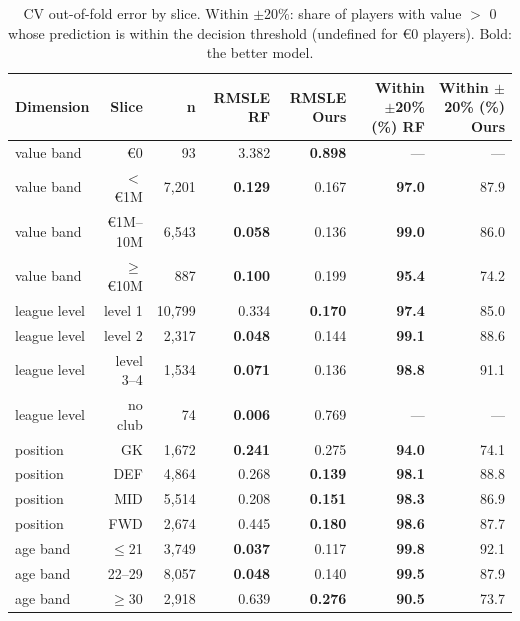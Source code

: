 \begin{table}[t]
\centering
\small
\begin{tabular}{lrrrrrr}
\toprule
Dimension & Slice & n & RMSLE RF & RMSLE Ours & Within $\pm$20\% (\%) RF & Within $\pm$20\% (\%) Ours \\
\midrule
value band & \euro{}0 & 93 & 3.382 & \textbf{0.898} & --- & --- \\
value band & $<$\euro{}1M & 7,201 & \textbf{0.129} & 0.167 & \textbf{97.0} & 87.9 \\
value band & \euro{}1M--10M & 6,543 & \textbf{0.058} & 0.136 & \textbf{99.0} & 86.0 \\
value band & $\geq$\euro{}10M & 887 & \textbf{0.100} & 0.199 & \textbf{95.4} & 74.2 \\
league level & level 1 & 10,799 & 0.334 & \textbf{0.170} & \textbf{97.4} & 85.0 \\
league level & level 2 & 2,317 & \textbf{0.048} & 0.144 & \textbf{99.1} & 88.6 \\
league level & level 3--4 & 1,534 & \textbf{0.071} & 0.136 & \textbf{98.8} & 91.1 \\
league level & no club & 74 & \textbf{0.006} & 0.769 & --- & --- \\
position & GK & 1,672 & \textbf{0.241} & 0.275 & \textbf{94.0} & 74.1 \\
position & DEF & 4,864 & 0.268 & \textbf{0.139} & \textbf{98.1} & 88.8 \\
position & MID & 5,514 & 0.208 & \textbf{0.151} & \textbf{98.3} & 86.9 \\
position & FWD & 2,674 & 0.445 & \textbf{0.180} & \textbf{98.6} & 87.7 \\
age band & $\leq$21 & 3,749 & \textbf{0.037} & 0.117 & \textbf{99.8} & 92.1 \\
age band & 22--29 & 8,057 & \textbf{0.048} & 0.140 & \textbf{99.5} & 87.9 \\
age band & $\geq$30 & 2,918 & 0.639 & \textbf{0.276} & \textbf{90.5} & 73.7 \\
\bottomrule
\end{tabular}
\caption{CV out-of-fold error by slice. Within $\pm$20\%: share of players with value $>$ 0 whose prediction is within the decision threshold (undefined for \euro{}0 players). Bold: the better model.}
\label{tab:slices}
\end{table}
